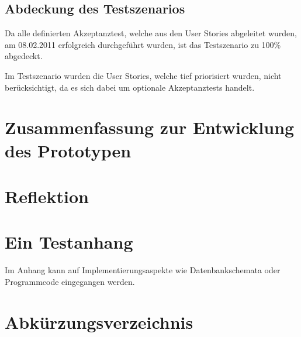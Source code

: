 \documentclass[abstracton, listof=totocnumbered,
bibliography=totocnumbered]{scrreprt}
\begin{document}
  \clearpage
  
  \section{Abdeckung des Testszenarios}
  
  Da alle definierten Akzeptanztest, welche aus den User Stories abgeleitet
  wurden, am 08.02.2011 erfolgreich durchgeführt wurden, ist das Testszenario zu
  100\% abgedeckt.
  
  Im Testszenario wurden die User Stories, welche tief priorisiert wurden, nicht
  berücksichtigt, da es sich dabei um optionale Akzeptanztests handelt.
  
  \newpage
  
  \chapter{Zusammenfassung zur Entwicklung des Prototypen}
  
  \chapter{Reflektion}
  
  
  \appendix
  
  \chapter{Ein Testanhang}
  
  Im Anhang kann auf Implementierungsaspekte wie Datenbankschemata
  oder Programmcode eingegangen werden.
  
  
  \chapter{Abkürzungsverzeichnis}
  \begin{acronym}
    \setlength{\itemsep}{-\parsep}
  \end{acronym}
  
\end{document}
